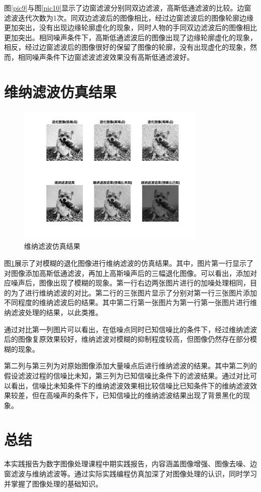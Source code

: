 \documentclass[conference]{IEEEtran}
\begin{document}
图\ref{pic9}与图\ref{pic10}显示了边窗滤波分别同双边滤波，高斯低通滤波的比较。边窗滤波迭代次数为1次。同双边滤波后的图像相比，经过边窗滤波后的图像轮廓边缘更加突出，没有出现边缘轮廓虚化的现象，同时人物的手同双边滤波后的图像相比更加突出。相同噪声条件下，高斯低通滤波后的图像出现了边缘轮廓虚化的现象，相反，经过边窗滤波后的图像很好的保留了图像的轮廓，没有出现虚化的现象，然而，相同噪声条件下边窗滤波滤波效果没有高斯低通滤波好。

\section{维纳滤波仿真结果}
\begin{figure}[htbp]
	\centerline{
		\includegraphics[width=9cm]{WF.png} 	
	}
	\caption{维纳滤波仿真结果}
	\label{pic11}
\end{figure}

图\ref{pic11}展示了对模糊的退化图像进行维纳滤波\cite{b7}\cite{b8}的仿真结果。其中，图片第一行显示了对图像添加高斯低通滤波，再加上高斯噪声后的三幅退化图像。可以看出，添加对应噪声后，图像出现了模糊的现象。第一行右边两张图片进行的加噪处理相同，目的为了进行维纳滤波的对比。第二行的三张图片显示了分别对第一行三张图片添加不同程度的维纳滤波后的结果。其中第二行第一张图片为第一行第一张图片进行维纳滤波处理的结果，以此类推。

通过对比第一列图片可以看出，在低噪点同时已知信噪比的条件下，经过维纳滤波后的图像复原效果较好，维纳滤波对模糊的抑制程度较高，但图像仍然存在部分模糊的现象。

第二列与第三列为对原始图像添加大量噪点后进行维纳滤波的结果。其中第二列的假设滤波过程的信噪比未知，第三列为已知信噪比条件下的滤波结果。通过对比可以看出，信噪比未知条件下的维纳滤波效果相比较信噪比已知条件下的维纳滤波效果较差，但在高噪声的条件下，已知信噪比的维纳滤波结果出现了背景黑化的现象。

\section{总结}
本实践报告为数字图像处理课程中期实践报告，内容涵盖图像增强、图像去噪、边窗滤波与维纳滤波等。通过实际实践编程仿真加深了对图像处理的认识，同时学习并掌握了图像处理的基础知识。
\end{document}

